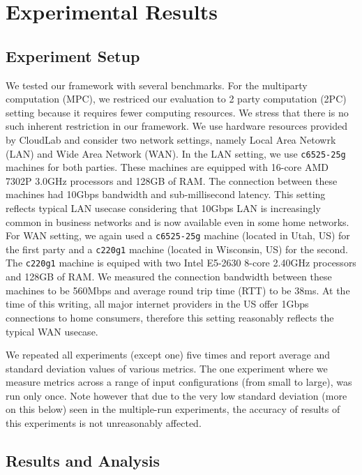 \section{Experimental Results}
\label{sec:results}

\subsection{Experiment Setup}\label{sec:experiment_setup}
We tested our framework with several benchmarks. For the multiparty computation (MPC), we restriced our evaluation to 2 party computation (2PC) setting because it requires fewer computing resources. We stress that there is no such inherent restriction in our framework. We use hardware resources provided by CloudLab\cite{DuplyakinATC19} and consider two network settings, namely Local Area Netowrk (LAN) and Wide Area Network (WAN). In the LAN setting, we use \texttt{c6525-25g} machines for both parties. These machines are equipped with 16-core AMD 7302P 3.0GHz processors and 128GB of RAM. The connection between these machines had 10Gbps bandwidth and sub-millisecond latency. This setting reflects typical LAN usecase considering that 10Gbps LAN is increasingly common in business networks and is now available even in some home networks. For WAN setting, we again used a \texttt{c6525-25g} machine (located in Utah, US) for the first party and a \texttt{c220g1} machine (located in Wisconsin, US) for the second. The \texttt{c220g1} machine is equiped with two Intel E5-2630 8-core 2.40GHz processors and 128GB of RAM. We measured the connection bandwidth between these machines to be 560Mbps and average round trip time (RTT) to be 38ms. At the time of this writing, all major internet providers in the US offer 1Gbps connections to home consumers, therefore this setting reasonably reflects the typical WAN usecase.

We repeated all experiments (except one) five times and report average and standard deviation values of various metrics. The one experiment where we measure metrics across a range of input configurations (from small to large), was run only once. Note however that due to the very low standard deviation (more on this below) seen in the multiple-run experiments, the accuracy of results of this experiments is not unreasonably affected.

\subsection{Results and Analysis}\label{sec:result_analysis}



